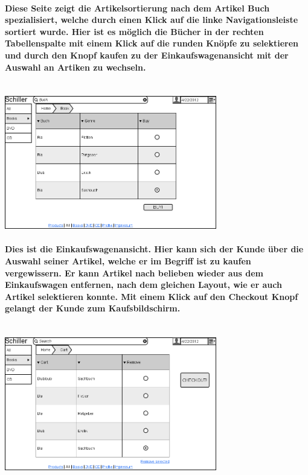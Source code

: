 \documentclass[a4paper]{article}
\begin{document}
\paragraph{Diese Seite zeigt die Artikelsortierung nach dem Artikel Buch spezialisiert, welche durch einen Klick auf die linke Navigationsleiste sortiert wurde. Hier ist es möglich die Bücher in der rechten Tabellenspalte mit einem Klick auf die runden Knöpfe zu selektieren und durch den Knopf kaufen zu der Einkaufswagenansicht mit der Auswahl an Artiken zu wechseln.\\ \\}
\includegraphics[width=350px]{7bookSearch.png}

\paragraph{Dies ist die Einkaufswagenansicht. Hier kann sich der Kunde über die Auswahl seiner Artikel, welche er im Begriff ist zu kaufen vergewissern. Er kann Artikel nach belieben wieder aus dem Einkaufswagen entfernen, nach dem gleichen Layout, wie er auch Artikel selektieren konnte. Mit einem Klick auf den Checkout Knopf gelangt der Kunde zum Kaufsbildschirm.\\ \\}
\includegraphics[width=350px]{8CartView.png}
\end{document}
